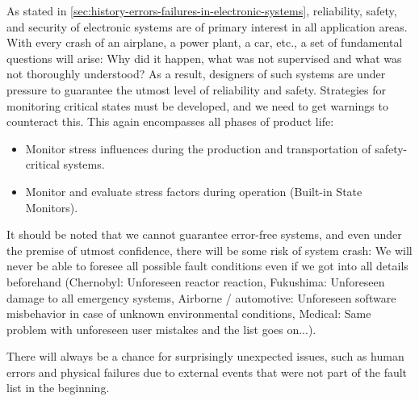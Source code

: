 As stated in \autoref{sec:history-errors-failures-in-electronic-systems},
reliability, safety, and security of electronic systems are of primary interest
in all application areas.
With every crash of an airplane, a power plant, a car, etc., a set of
fundamental questions will arise: Why did it happen, what was not supervised
and what was not thoroughly understood?
As a result, designers of such systems are under pressure to guarantee the
utmost level of reliability and safety.
Strategies for monitoring critical
states must be developed, and we need to get warnings to counteract this.
This again encompasses all phases of product life:

\begin{itemize}[topsep=8pt,itemsep=4pt,partopsep=4pt, parsep=4pt]

    \item Monitor stress influences during the production and transportation
    of safety-critical systems.

    \item Monitor and evaluate stress factors during operation
    (Built-in State Monitors).

\end{itemize}

It should be noted that we cannot guarantee error-free systems, and even under
the premise of utmost confidence, there will be some risk of system crash:
We will never be able to foresee all possible fault conditions even if we got
into all details beforehand (Chernobyl: Unforeseen reactor reaction,
Fukushima: Unforeseen damage to all emergency systems,
Airborne / automotive: Unforeseen software misbehavior in case of unknown
environmental conditions, Medical: Same problem with unforeseen
user mistakes and the list goes on...).

There will always be a chance for surprisingly unexpected issues, such as human
errors and physical failures due to external events that were not part of the
fault list in the beginning.
